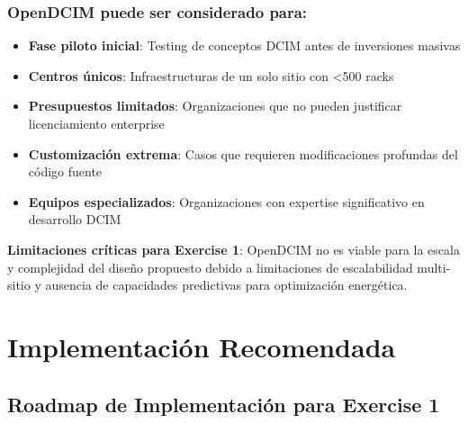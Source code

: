 \documentclass[12pt,a4paper]{article}
\begin{document}
\subsubsection{OpenDCIM puede ser considerado para:}
\begin{itemize}
    \item \textbf{Fase piloto inicial}: Testing de conceptos DCIM antes de inversiones masivas
    \item \textbf{Centros únicos}: Infraestructuras de un solo sitio con <500 racks
    \item \textbf{Presupuestos limitados}: Organizaciones que no pueden justificar licenciamiento enterprise
    \item \textbf{Customización extrema}: Casos que requieren modificaciones profundas del código fuente
    \item \textbf{Equipos especializados}: Organizaciones con expertise significativo en desarrollo DCIM
\end{itemize}

\textbf{Limitaciones críticas para Exercise 1}: OpenDCIM no es viable para la escala y complejidad del diseño propuesto debido a limitaciones de escalabilidad multi-sitio y ausencia de capacidades predictivas para optimización energética.

\section{Implementación Recomendada}

\subsection{Roadmap de Implementación para Exercise 1}
\end{document}
